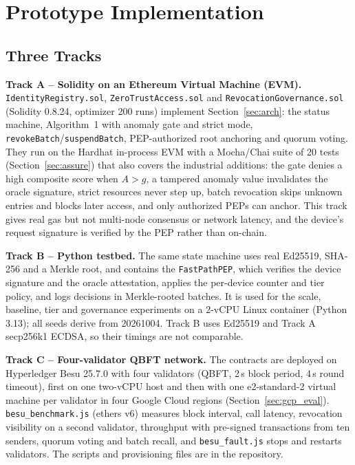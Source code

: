 \section{Prototype Implementation}\label{sec:impl}

\subsection{Three Tracks}\label{sec:env}
\textbf{Track A -- Solidity on an Ethereum Virtual Machine (EVM).} \texttt{IdentityRegistry.sol}, \texttt{ZeroTrustAccess.sol} and \texttt{RevocationGovernance.sol} (Solidity 0.8.24, optimizer 200 runs) implement Section~\ref{sec:arch}: the status machine, Algorithm~1 with anomaly gate and strict mode, \texttt{revokeBatch}/\texttt{suspendBatch}, PEP-authorized root anchoring and quorum voting. They run on the Hardhat in-process EVM with a Mocha/Chai suite of 20 tests (Section~\ref{sec:assure}) that also covers the industrial additions: the gate denies a high composite score when $A>g$, a tampered anomaly value invalidates the oracle signature, strict resources never step up, batch revocation skips unknown entries and blocks later access, and only authorized PEPs can anchor. This track gives real gas but not multi-node consensus or network latency, and the device's request signature is verified by the PEP rather than on-chain.

\textbf{Track B -- Python testbed.} The same state machine uses real Ed25519, SHA-256 and a Merkle root, and contains the \texttt{FastPathPEP}, which verifies the device signature and the oracle attestation, applies the per-device counter and tier policy, and logs decisions in Merkle-rooted batches. It is used for the scale, baseline, tier and governance experiments on a 2-vCPU Linux container (Python 3.13); all seeds derive from 20261004. Track B uses Ed25519 and Track A secp256k1 ECDSA, so their timings are not comparable.

\textbf{Track C -- Four-validator QBFT network.} The contracts are deployed on Hyperledger Besu 25.7.0 with four validators (QBFT, 2\,s block period, 4\,s round timeout), first on one two-vCPU host and then with one e2-standard-2 virtual machine per validator in four Google Cloud regions (Section~\ref{sec:gcp_eval}). \texttt{besu\_benchmark.js} (ethers v6) measures block interval, call latency, revocation visibility on a second validator, throughput with pre-signed transactions from ten senders, quorum voting and batch recall, and \texttt{besu\_fault.js} stops and restarts validators. The scripts and provisioning files are in the repository.

